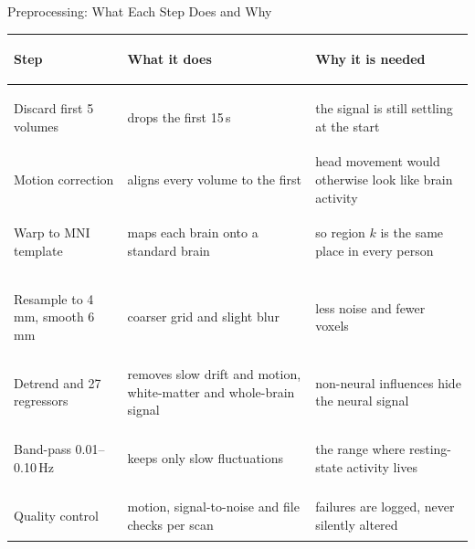\documentclass[aspectratio=169,11pt]{beamer}
\begin{document}
\begin{frame}{Preprocessing: What Each Step Does and Why}
  \footnotesize
  \begin{tabularx}{\textwidth}{>{\bfseries\raggedright\arraybackslash}p{3.6cm}>{\raggedright\arraybackslash}p{4.5cm}>{\raggedright\arraybackslash}X}
    \toprule
    Step & What it does & Why it is needed \\
    \midrule
    Discard first 5 volumes & drops the first 15\,s & the signal is still settling at the start \\[2pt]
    Motion correction & aligns every volume to the first & head movement would otherwise look like brain activity \cite{r8,r9} \\[2pt]
    Warp to MNI template & maps each brain onto a standard brain \cite{r10} & so region $k$ is the same place in every person \\[2pt]
    Resample to 4\,mm, smooth 6\,mm & coarser grid and slight blur & less noise and fewer voxels \\[2pt]
    Detrend and 27 regressors & removes slow drift and motion, white-matter and whole-brain signal & non-neural influences hide the neural signal \\[2pt]
    Band-pass 0.01--0.10\,Hz & keeps only slow fluctuations & the range where resting-state activity lives \\[2pt]
    Quality control & motion, signal-to-noise and file checks per scan & failures are logged, never silently altered \\
    \bottomrule
  \end{tabularx}
\end{frame}
\end{document}
